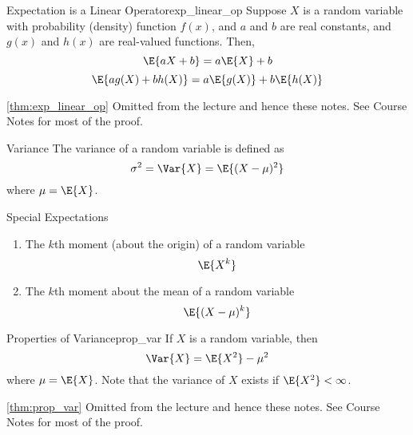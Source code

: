\begin{Theorem}{Expectation is a Linear Operator}{exp_linear_op}
    Suppose $ X $ is a random variable with probability (density)
    function $ f(x) $, and $ a $ and $ b $ are real constants,
    and $ g(x) $ and $ h(x) $ are real-valued functions. Then,
    \[ \E{aX+b}=a\E{X}+b \]
    \[ \E{a g(X)+b h(X)}=a\E{g(X)}+b\E{h(X)} \]
\end{Theorem}
\begin{Proof}{\ref{thm:exp_linear_op}}{}
    Omitted from the lecture and hence these notes.
    See Course Notes for most of the proof.
\end{Proof}
\begin{Definition}{Variance}{}
    The variance of a random variable is defined as
    \[ \sigma^2=\Var{X}=\E{(X-\mu)^2} \]
    where $ \mu=\E{X} $.
\end{Definition}
\begin{Definition}{Special Expectations}{}
    \begin{enumerate}[label=(\Roman*)]
        \item The $ k $th moment (about the origin) of a random variable
              \[ \E{X^k} \]
        \item The $ k $th moment about the mean of a random variable
              \[ \E{(X-\mu)^k} \]
    \end{enumerate}
\end{Definition}
\begin{Theorem}{Properties of Variance}{prop_var}
    If $ X $ is a random variable, then
    \[ \Var{X}=\E{X^2}-\mu^2 \]
    where $ \mu=\E{X} $. Note that the
    variance of $ X $ exists if $ \E{X^2}<\infty $.
\end{Theorem}
\begin{Proof}{\ref{thm:prop_var}}{}
    Omitted from the lecture and hence these notes.
    See Course Notes for most of the proof.
\end{Proof}

